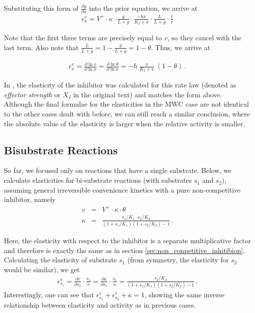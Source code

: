 \documentclass[12pt,a4paper]{article}
\begin{document}
Substituting this form of $\frac{\partial g}{\partial x}$ into the prior equation, we arrive at 
\begin{eqnarray}
\epsilon_x^v = V^+ \cdot \kappa \cdot \frac{g}{L + g} \cdot \frac{-hx}{K_I + x} \cdot \frac{L}{L + g} \cdot \frac{1}{v}
\end{eqnarray}

\noindent Note that the first three terms are precisely equal to $v$, so they cancel with the last term. Also note that $\frac{L}{L + g} = 1 - \frac{g}{L + g} = 1 - \theta$. Thus, we arrive at

\begin{eqnarray}
\epsilon_x^v = \frac{\partial \ln{v}}{\partial \ln{x}} = \frac{\partial \ln{\theta}}{\partial \ln{x}} = -h~\frac{x}{K_I + x} ~\left(1 - \theta \right)\,.
\end{eqnarray}

In \cite{Heinrich1974-yj}, the elasticity of the inhibitor was calculated for this rate law (denoted as \emph{effector strength} or $X_I$ in the original text) and matches the form above.
Although the final formulae for the elasticities in the MWC case are not identical to the other cases dealt with before, we can still reach a similar conclusion, where the absolute value of the elasticity is larger when the relative activity is smaller.

\subsection{Bisubstrate Reactions}
So far, we focused only on reactions that have a single substrate. Below, we calculate elasticities for bi-substrate reactions (with substrates $s_1$ and $s_2$), assuming general irreversible convenience kinetics with a pure non-competitive inhibitor, namely
\begin{eqnarray}
v &=& V^+ \cdot \kappa \cdot \theta  \nonumber\\
\kappa &=& \frac{s_1/K_1 \cdot s_2/K_2}{(1 + s_1/K_1) (1 + s_2 / K_2) - 1}\,.
\end{eqnarray}

Here, the elasticity with respect to the inhibitor is a separate multiplicative factor and therefore is exactly the same as in section \ref{sec:non_conpetitive_inhitibion}. Calculating the elasticity of substrate $s_1$ (from symmetry, the elasticity for $s_2$ would be similar), we get
\begin{eqnarray}
\epsilon^{v}_{s_1} = \frac{\partial v}{\partial s_1} \cdot \frac{s_1}{v}
 = \frac{\partial \kappa}{\partial s_1} \cdot \frac{s_1}{\kappa} 
 = \frac{s_2 / K_2}{(1 + s_1/K_1) (1 + s_2 / K_2) - 1}\,.
\end{eqnarray}
Interestingly, one can see that $\epsilon^{v}_{s_1} + \epsilon^{v}_{s_2} + \kappa = 1$, showing the same inverse relationship between elasticity and activity as in previous cases.
\end{document}
